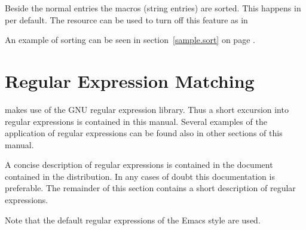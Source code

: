 \documentclass[11pt,a4paper]{scrbook}
\begin{document}
\begin{Resources}
\end{Resources}

Beside the normal entries the macros (string entries) are sorted. This happens
in per default. The resource  can be used to turn off this
feature as in

\begin{Resources}
\end{Resources}

An example of sorting can be seen in section~\ref{sample.sort} on page
\pageref{sample.sort}.

\begin{Summary}
\end{Summary}

\section{Regular Expression Matching}\label{sec:regex}

\BibTool{} makes use of the GNU regular expression library. Thus a short
excursion into regular expressions is contained in this manual. Several
examples of the application of regular expressions can be found also in other
sections of this manual.

A concise description of regular expressions is contained in the document
 contained in the \BibTool{} distribution. In any
cases of doubt this documentation is preferable. The remainder of this section
contains a short description of regular expressions.

Note that the default regular expressions of the Emacs style are used.
\end{document}
